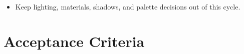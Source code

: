 \begin{itemize}
  Provide \texttt{r\allowbreak{}a\allowbreak{}y\allowbreak{}t\allowbreak{}r\allowbreak{}a\allowbreak{}c\allowbreak{}e\allowbreak{}S\allowbreak{}p\allowbreak{}h\allowbreak{}e\allowbreak{}r\allowbreak{}e\allowbreak{}H\allowbreak{}i\allowbreak{}t\allowbreak{}(\allowbreak{})}, \texttt{r\allowbreak{}a\allowbreak{}y\allowbreak{}t\allowbreak{}r\allowbreak{}a\allowbreak{}c\allowbreak{}e\allowbreak{}P\allowbreak{}l\allowbreak{}a\allowbreak{}n\allowbreak{}e\allowbreak{}H\allowbreak{}i\allowbreak{}t\allowbreak{}(\allowbreak{})}, and \texttt{r\allowbreak{}a\allowbreak{}y\allowbreak{}t\allowbreak{}r\allowbreak{}a\allowbreak{}c\allowbreak{}e\allowbreak{}N\allowbreak{}e\allowbreak{}a\allowbreak{}r\allowbreak{}e\allowbreak{}s\allowbreak{}t\allowbreak{}H\allowbreak{}i\allowbreak{}t\allowbreak{}(\allowbreak{})} primitives.
\item
  Keep lighting, materials, shadows, and palette decisions out of this cycle.
\end{itemize}

\section{Acceptance Criteria}\label{record-159-acceptance-criteria}

